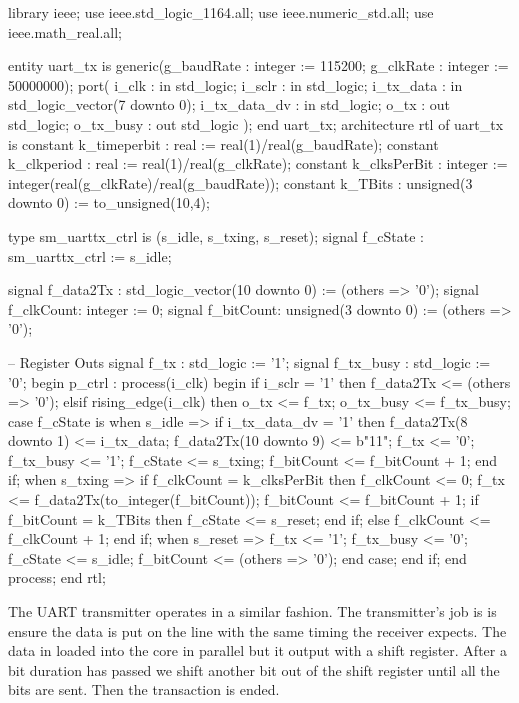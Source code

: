 \begin{VHDLlisting}[tabsize=8]
library ieee;
  use ieee.std_logic_1164.all;
  use ieee.numeric_std.all;
  use ieee.math_real.all;
  
entity uart_tx is
  generic(g_baudRate : integer := 115200;
          g_clkRate  : integer := 50000000);
  port(
      i_clk        : in    std_logic;
      i_sclr       : in    std_logic;
      i_tx_data    : in    std_logic_vector(7 downto 0);
      i_tx_data_dv : in    std_logic;
      o_tx         :   out std_logic;
      o_tx_busy    :   out std_logic
      );
end uart_tx;
architecture rtl of uart_tx is 
  constant k_timeperbit : real := real(1)/real(g_baudRate);
  constant k_clkperiod  : real := real(1)/real(g_clkRate);
  constant k_clksPerBit : integer := integer(real(g_clkRate)/real(g_baudRate)); 
  constant k_TBits      : unsigned(3 downto 0) := to_unsigned(10,4);
  
  type sm_uarttx_ctrl is (s_idle, s_txing, s_reset);
  signal f_cState : sm_uarttx_ctrl := s_idle;
  
  signal f_data2Tx : std_logic_vector(10 downto 0) := (others => '0');
  signal f_clkCount: integer := 0;
  signal f_bitCount: unsigned(3 downto 0) := (others => '0');
  
  -- Register Outs
  signal f_tx : std_logic := '1';
  signal f_tx_busy : std_logic := '0';
begin
  p_ctrl : process(i_clk) 
  begin
    if i_sclr = '1' then
        f_data2Tx <= (others => '0');
    elsif rising_edge(i_clk) then
      o_tx <= f_tx;
      o_tx_busy <= f_tx_busy;
      case f_cState is  
        when s_idle =>
          if i_tx_data_dv = '1' then
            f_data2Tx(8 downto 1) <= i_tx_data;
            f_data2Tx(10 downto 9) <= b"11";
            f_tx <= '0';
            f_tx_busy <= '1';
            f_cState <= s_txing;
            f_bitCount <= f_bitCount + 1;
          end if;
        when s_txing => 
          if f_clkCount = k_clksPerBit then
            f_clkCount <= 0;
            f_tx <= f_data2Tx(to_integer(f_bitCount));
            f_bitCount <= f_bitCount + 1;
            if f_bitCount = k_TBits then
              f_cState <= s_reset;
            end if;
          else
            f_clkCount <= f_clkCount + 1;
          end if;
        when s_reset => 
          f_tx <= '1';
          f_tx_busy <= '0';
          f_cState <= s_idle;
          f_bitCount <= (others => '0');
      end case;
    end if;
  end process;
end rtl;
\end{VHDLlisting}
	
The \ac{UART} transmitter operates in a similar fashion. The transmitter's job is is ensure the data is put on the line with the same timing the receiver expects. The data in loaded into the core in parallel but it output with a shift register. After a bit duration has passed we shift another bit out of the shift register until all the bits are sent. Then the transaction is ended.
	

